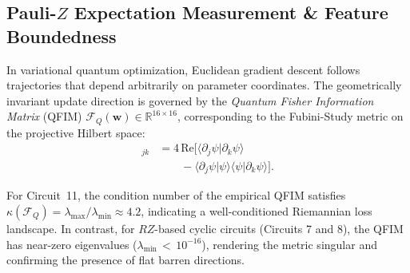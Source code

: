 \documentclass[journal]{IEEEtran}
\begin{document}
\subsection{Pauli-$Z$ Expectation Measurement \& Feature Boundedness}
In variational quantum optimization, Euclidean gradient descent follows trajectories that depend arbitrarily on parameter coordinates. The geometrically invariant update direction is governed by the \textit{Quantum Fisher Information Matrix} (QFIM) $\mathcal{F}_Q(\mathbf{w}) \in \mathbb{R}^{16 \times 16}$, corresponding to the Fubini-Study metric on the projective Hilbert space:
\begin{align}
[\mathcal{F}_Q]_{jk} &= 4 \, \mathrm{Re}\Big[ \langle \partial_j \psi | \partial_k \psi \rangle \nonumber \\
&\qquad - \langle \partial_j \psi | \psi \rangle \langle \psi | \partial_k \psi \rangle \Big].
\label{eq:qfim_definition}
\end{align}

For Circuit~11, the condition number of the empirical QFIM satisfies $\kappa(\mathcal{F}_Q) = \lambda_{\max}/\lambda_{\min} \approx 4.2$, indicating a well-conditioned Riemannian loss landscape. In contrast, for $RZ$-based cyclic circuits (Circuits 7 and 8), the QFIM has near-zero eigenvalues ($\lambda_{\min} \,{<}\, 10^{-16}$), rendering the metric singular and confirming the presence of flat barren directions.
\end{document}
